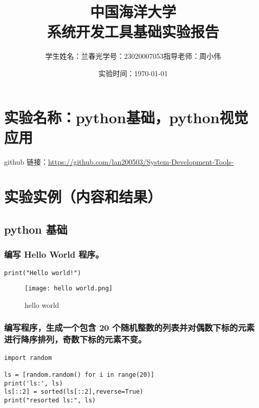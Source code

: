 \documentclass{ctexart}
\begin{document}
\title{中国海洋大学\\系统开发工具基础实验报告}
\author{学生姓名：兰春光\hspace{20}学号：23020007053\hspace{20}指导老师：周小伟}
\date{\hspace{5}实验时间：\today}
\maketitle
\footnotesize\tableofcontents




\section{实验名称：python基础，python视觉应用}

github 链接：\href{URL}{https://github.com/lan200503/System-Development-Tools-}


\section{实验实例（内容和结果）}

\subsection{python 基础}

\subsubsection{编写 Hello World 程序。}
\begin{lstlisting}
print("Hello world!")
\end{lstlisting}

\begin{figure}[H]
    \centering
    \texttt{[image: hello world.png]}
    \caption{hello world}
    \label{fig:enter-label}
\end{figure}



\subsubsection{编写程序，生成一个包含 20 个随机整数的列表并对偶数下标的元素进行降序排列，奇数下标的元素不变。}
\begin{lstlisting}
import random

ls = [random.random() for i in range(20)]
print('ls:', ls)
ls[::2] = sorted(ls[::2],reverse=True)
print("resorted ls:", ls)
\end{lstlisting}
\end{document}
